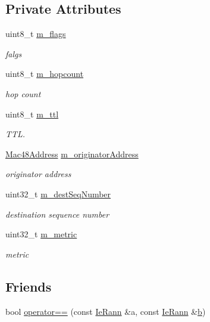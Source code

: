 \subsection*{Private Attributes}
\begin{DoxyCompactItemize}
\item 
uint8\+\_\+t \hyperlink{classns3_1_1dot11s_1_1IeRann_a0f1db2fd566595a981525e11806dba6b}{m\+\_\+flags}
\begin{DoxyCompactList}\small\item\em falgs \end{DoxyCompactList}\item 
uint8\+\_\+t \hyperlink{classns3_1_1dot11s_1_1IeRann_a7d1628c661d49afd647ec10b768a6e7e}{m\+\_\+hopcount}
\begin{DoxyCompactList}\small\item\em hop count \end{DoxyCompactList}\item 
uint8\+\_\+t \hyperlink{classns3_1_1dot11s_1_1IeRann_a5797397e4b461481c9e00581e0923b7d}{m\+\_\+ttl}
\begin{DoxyCompactList}\small\item\em T\+TL. \end{DoxyCompactList}\item 
\hyperlink{classns3_1_1Mac48Address}{Mac48\+Address} \hyperlink{classns3_1_1dot11s_1_1IeRann_a26139f787881cbf20a6c61e1da931df9}{m\+\_\+originator\+Address}
\begin{DoxyCompactList}\small\item\em originator address \end{DoxyCompactList}\item 
uint32\+\_\+t \hyperlink{classns3_1_1dot11s_1_1IeRann_a870e4e65b2afa14829199d2da495bde0}{m\+\_\+dest\+Seq\+Number}
\begin{DoxyCompactList}\small\item\em destination sequence number \end{DoxyCompactList}\item 
uint32\+\_\+t \hyperlink{classns3_1_1dot11s_1_1IeRann_af20a95cd95a0eea317e0ec7947691d16}{m\+\_\+metric}
\begin{DoxyCompactList}\small\item\em metric \end{DoxyCompactList}\end{DoxyCompactItemize}
\subsection*{Friends}
\begin{DoxyCompactItemize}
\item 
bool \hyperlink{classns3_1_1dot11s_1_1IeRann_a4f2c01dc7818b3e3d38a929b3462ab49}{operator==} (const \hyperlink{classns3_1_1dot11s_1_1IeRann}{Ie\+Rann} \&a, const \hyperlink{classns3_1_1dot11s_1_1IeRann}{Ie\+Rann} \&\hyperlink{lte__pathloss_8m_a21ad0bd836b90d08f4cf640b4c298e7c}{b})
\end{DoxyCompactItemize}
